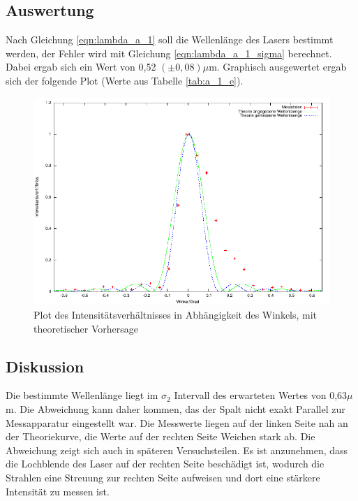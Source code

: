 \documentclass[12pt]{scrartcl}
\begin{document}
\subsection{Auswertung}
Nach Gleichung \ref{eqn:lambda_a_1} soll die Wellenlänge des Lasers bestimmt werden, der Fehler wird mit Gleichung \ref{eqn:lambda_a_1_sigma} berechnet. Dabei ergab sich ein Wert von 0,52 $(\pm 0,08) \mu$m. Graphisch ausgewertet ergab sich der folgende Plot (Werte aus Tabelle \ref{tab:a_1_e}).

\begin{figure}[H]
\centering
    \includegraphics[scale = 1]{a_1.pdf}
  	\caption[Plot des Intensitätsverhältnisses in Abhängigkeit des Winkels, mit theoretischer Vorhersage]{Plot des Intensitätsverhältnisses in Abhängigkeit des Winkels, mit theoretischer Vorhersage}
  \label{fig:a_1}
\end{figure}

\subsection{Diskussion}
Die bestimmte Wellenlänge liegt im $\sigma_2$ Intervall des erwarteten Wertes von 0,63$\mu$m. Die Abweichung kann daher kommen, das der Spalt nicht exakt Parallel zur Messapparatur eingestellt war.
Die Messwerte liegen auf der linken Seite nah an der Theoriekurve, die Werte auf der rechten Seite Weichen stark ab. Die Abweichung zeigt sich auch in späteren Versuchsteilen. Es ist anzunehmen, dass die Lochblende des Laser auf der rechten Seite beschädigt ist, wodurch die Strahlen eine Streuung zur rechten Seite aufweisen und dort eine stärkere Intensität zu messen ist.
\end{document}
